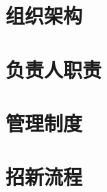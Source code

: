 \documentclass[openany]{ctexbook}
\begin{document}
\maketitle\tableofcontents\clearpage

\chapter{组织架构}
    

\chapter{负责人职责}
    

\chapter{管理制度}
    

\chapter{招新流程}
    
\end{document}
